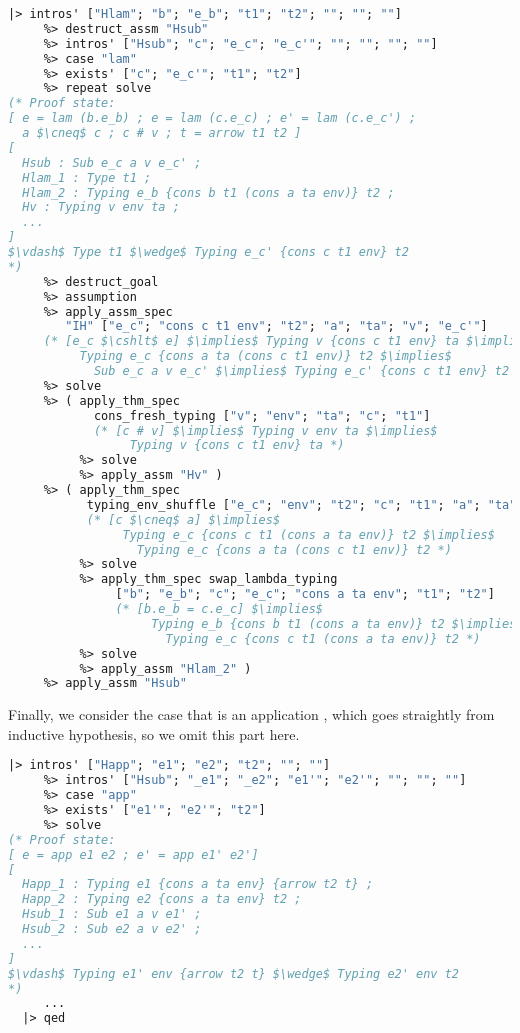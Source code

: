 \documentclass[english, mgr]{iithesis}
\newcommand{\lstt}[1]{{\text{\lstinline[columns=fixed,mathescape]{#1}}}}
\begin{document}
\begin{lstlisting}[mathescape,language=OCaml,escapebegin=\color{codegreen}]
  |> intros' ["Hlam"; "b"; "e_b"; "t1"; "t2"; ""; ""; ""]
     %> destruct_assm "Hsub"
     %> intros' ["Hsub"; "c"; "e_c"; "e_c'"; ""; ""; ""; ""]
     %> case "lam"
     %> exists' ["c"; "e_c'"; "t1"; "t2"]
     %> repeat solve
(* Proof state:
[ e = lam (b.e_b) ; e = lam (c.e_c) ; e' = lam (c.e_c') ;
  a $\cneq$ c ; c # v ; t = arrow t1 t2 ]
[
  Hsub : Sub e_c a v e_c' ;
  Hlam_1 : Type t1 ;
  Hlam_2 : Typing e_b {cons b t1 (cons a ta env)} t2 ;
  Hv : Typing v env ta ;
  ...
]
$\vdash$ Type t1 $\wedge$ Typing e_c' {cons c t1 env} t2
*)
     %> destruct_goal
     %> assumption
     %> apply_assm_spec
        "IH" ["e_c"; "cons c t1 env"; "t2"; "a"; "ta"; "v"; "e_c'"]
     (* [e_c $\cshlt$ e] $\implies$ Typing v {cons c t1 env} ta $\implies$
          Typing e_c {cons a ta (cons c t1 env)} t2 $\implies$
            Sub e_c a v e_c' $\implies$ Typing e_c' {cons c t1 env} t2  *)
     %> solve
     %> ( apply_thm_spec
            cons_fresh_typing ["v"; "env"; "ta"; "c"; "t1"]
            (* [c # v] $\implies$ Typing v env ta $\implies$
                 Typing v {cons c t1 env} ta *)
          %> solve
          %> apply_assm "Hv" )
     %> ( apply_thm_spec
           typing_env_shuffle ["e_c"; "env"; "t2"; "c"; "t1"; "a"; "ta"]
           (* [c $\cneq$ a] $\implies$
                Typing e_c {cons c t1 (cons a ta env)} t2 $\implies$
                  Typing e_c {cons a ta (cons c t1 env)} t2 *)
          %> solve
          %> apply_thm_spec swap_lambda_typing
               ["b"; "e_b"; "c"; "e_c"; "cons a ta env"; "t1"; "t2"]
               (* [b.e_b = c.e_c] $\implies$
                    Typing e_b {cons b t1 (cons a ta env)} t2 $\implies$
                      Typing e_c {cons c t1 (cons a ta env)} t2 *)
          %> solve
          %> apply_assm "Hlam_2" )
     %> apply_assm "Hsub"
\end{lstlisting}
Finally, we consider the case that \lstt{e} is an application \lstt{e1 e2},
which goes straightly from inductive hypothesis, so we omit this part here.
\begin{lstlisting}[mathescape,language=OCaml,escapebegin=\color{codegreen}]
  |> intros' ["Happ"; "e1"; "e2"; "t2"; ""; ""]
     %> intros' ["Hsub"; "_e1"; "_e2"; "e1'"; "e2'"; ""; ""; ""]
     %> case "app"
     %> exists' ["e1'"; "e2'"; "t2"]
     %> solve
(* Proof state:
[ e = app e1 e2 ; e' = app e1' e2']
[
  Happ_1 : Typing e1 {cons a ta env} {arrow t2 t} ;
  Happ_2 : Typing e2 {cons a ta env} t2 ;
  Hsub_1 : Sub e1 a v e1' ;
  Hsub_2 : Sub e2 a v e2' ;
  ...
]
$\vdash$ Typing e1' env {arrow t2 t} $\wedge$ Typing e2' env t2
*)
     ...
  |> qed
\end{lstlisting}
\end{document}

